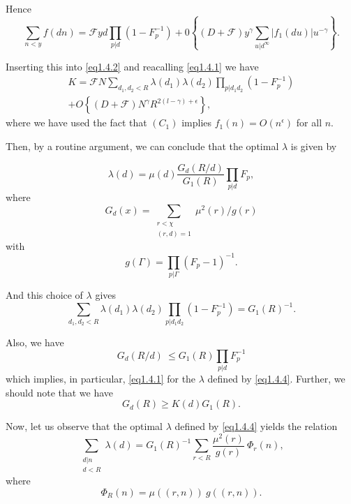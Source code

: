 Hence
$$
\sum_{n < y } f(dn) = \mathcal{F} y d \prod_{p | d} (1-F^{-1}_p )+ 0 \left\{
(D+ \mathcal{F}) y^\gamma  \sum_{u | d^\infty} | f_1(du)| u^{-\gamma}
\right\}. 
$$

Inserting this into \eqref{eq1.4.2} and reacalling
\eqref{eq1.4.1} we have  
\begin{multline*}
  K = \mathcal{F} N \sum_{d_1,d_2 <R } \lambda(d_1)\lambda(d_2) \prod_{p
  | d_1 d_2} (1-F^{-1}_p) \tag{1.4.3}\label{eq1.4.3}\\
 + O\left\{ (D+ \mathcal{F}) N^\gamma R^{2 (l-\gamma) + \epsilon}\right\},
\end{multline*}
where we have used the fact that $(C_1)$ implies $ f_1 (n) = O
(n^\epsilon )$ for all $n$. 

Then, by a routine  argument, we can conclude that the optimal
$\lambda$ is given by  

\begin{equation*}
  \lambda(d) = \mu(d)  \frac{G_d (R/d)}{G_1 (R)} \prod_{p | d}F_p,
  \tag{1.4.4} \label{eq1.4.4}
\end{equation*}
where
\begin{equation*}
  G_d (x) = \sum_{\substack{r< \chi \\ (r, d)=1}}
  \mu^2(r)/g(r) \tag{1.4.5} \label{eq1.4.5}
\end{equation*}
with\pageoriginale
\begin{equation*}
  g(\Gamma) = \prod_{p | \Gamma}
  (F_p-1)^{-1}. \tag{1.4.6}\label{eq1.4.6} 
\end{equation*}

And this choice of $\lambda$ gives
\begin{equation*}
\sum_{d_1,d_2 <R } \lambda(d_1)\lambda(d_2) \prod_{p | d_1 d_2}
(1-F^{-1}_p) = G_1 (R)^{-1}.\tag{1.4.7} \label{eq1.4.7}
\end{equation*}

Also, we have
\begin{equation*}
  G_d (R/d) ~ \leq G_1 (R) \prod_{p | d} F^{-1}_p
  \tag{1.4.8}\label{eq1.4.8} 
\end{equation*}
which implies, in particular, \eqref{eq1.4.1} for the $\lambda$
defined by \eqref{eq1.4.4}. Further, we should note that  we have 
\begin{equation*}
  G_d(R) \ge K(d)G_1 (R). \tag{1.4.9}\label{eq1.4.9}
\end{equation*}

Now, let us observe that the optimal $\lambda$ defined by
\eqref{eq1.4.4} yields the relation 
$$
\sum_{\substack{d | n \\ d < R}} \lambda(d) = G_1(R)^{-1} \sum_{r
  < R} \frac{\mu^2 (r)}{g(r)}  ~ \Phi_r (n), 
$$
where
\begin{equation*}
  \Phi_R(n) = \mu ((r, n)) ~  g((r, n)). \tag{1.4.10}\label{eq1.4.10}
\end{equation*}

